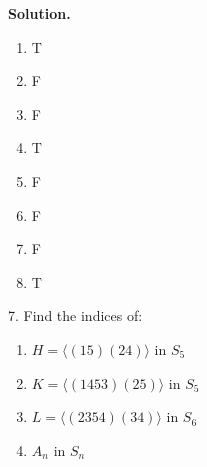 \documentclass[10pt,]{book}
\theoremstyle{plain}
\theoremstyle{definition}
\theoremstyle{definition}
\theoremstyle{definition}
\theoremstyle{definition}
\numberwithin{equation}{section}
\begin{document}
\begin{exerciselist}
\par\smallskip
\par\smallskip
\noindent\textbf{Solution.}\hypertarget{solution-55}{}\quad
\leavevmode%
\begin{multicols}{4}
\begin{enumerate}[label=(\alph*)]
\item\hypertarget{li-469}{}
          T
\item\hypertarget{li-470}{}
          F
\item\hypertarget{li-471}{}
          F
\item\hypertarget{li-472}{}
          T
\item\hypertarget{li-473}{}
          F
\item\hypertarget{li-474}{}
          F
\item\hypertarget{li-475}{}
          F
\item\hypertarget{li-476}{}
          T
\end{enumerate}
\end{multicols}
\item[7.]\hypertarget{exercise-56}{}
        Find the indices of:
        \leavevmode%
\begin{enumerate}[label=(\alph*)]
\item\hypertarget{li-477}{}
              \(H=\langle (15)(24)\rangle\) in \(S_5\)
\item\hypertarget{li-478}{}
              \(K=\langle (1453)(25)\rangle\) in \(S_5\)
\item\hypertarget{li-479}{}
              \(L=\langle (2354)(34)\rangle\) in \(S_6\)
\item\hypertarget{li-480}{}
              \(A_n\) in \(S_n\)
\end{enumerate}


\end{exerciselist}
\end{document}

